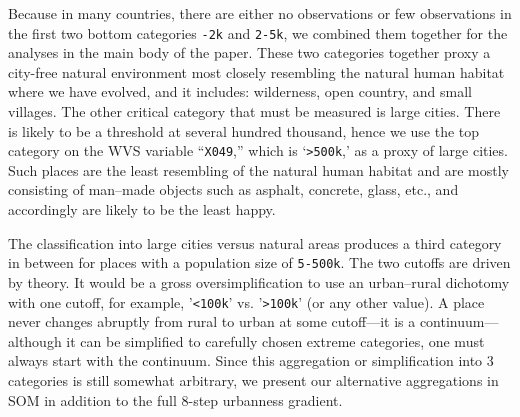 \documentclass[11pt, letterpaper]{article}
\begin{document}
Because in many countries, there are either no observations or few observations
in the first two bottom categories \texttt{-2k} and \texttt{2-5k}, we combined
them together for the analyses in the main body of the paper. These two
categories together proxy a city-free natural environment most closely
resembling the natural human habitat where we have evolved, and it includes:
wilderness, open country, and small villages. The other critical category that
must be measured %
 is large cities. There is likely to be a threshold at several hundred thousand, hence we use the top category on the WVS variable ``\texttt{X049},'' which is `\texttt{>500k},' as a proxy of large cities. Such places are the least resembling of the natural human habitat and are
mostly consisting of man--made objects such as asphalt, concrete, glass, etc.,
and accordingly are likely to be the least happy.

The classification into 
large cities versus natural areas produces a third category in between for places with a population size of \texttt{5-500k}.
%
The two cutoffs are driven by theory. It would be a gross oversimplification to use
an urban--rural dichotomy with one cutoff, for example, '\texttt{<100k}' vs. '\texttt{>100k}' (or any other value). A place never changes abruptly from rural to urban at some cutoff---it is a continuum---although it can be simplified to carefully chosen extreme categories, one must always start with the continuum.
%
Since this aggregation or simplification into 3 categories is still
somewhat arbitrary, we present our alternative aggregations in SOM in addition to the full 8-step urbanness gradient. 

\end{document}
